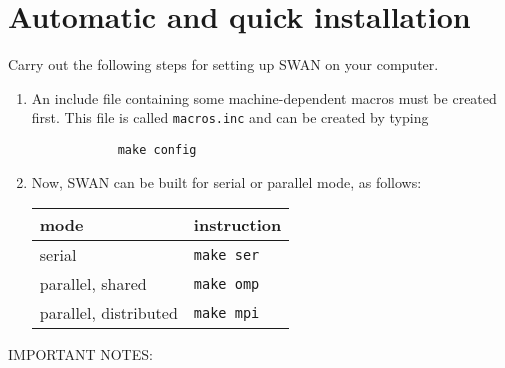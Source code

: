 \documentclass[12pt]{book}
\begin{document}
\section{Automatic and quick installation} \label{sec:quick}

Carry out the following steps for setting up SWAN on your computer.
\begin{enumerate}
  \item An include file containing some machine-dependent macros must be created first.
        This file is called {\tt macros.inc} and can be created by typing
        \begin{verbatim}
            make config
        \end{verbatim}
  \item Now, SWAN can be built for serial or parallel mode, as follows:
        \begin{table}[htb]
           \begin{center}
           \begin{tabular}{|l|l|}
              \hline
              {\bf mode}            & {\bf instruction} \\
              \hline
              serial                & {\tt make ser} \\
              \hline
              parallel, shared      & {\tt make omp} \\
              \hline
              parallel, distributed & {\tt make mpi} \\
              \hline
           \end{tabular}
           \end{center}
        \end{table}
\end{enumerate}
\newpage
\noindent
IMPORTANT NOTES:
\end{document}
